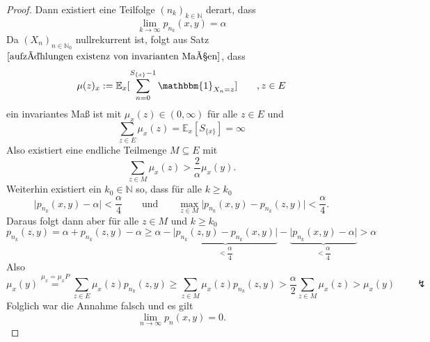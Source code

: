 \documentclass[a4paper,12pt]{scrartcl}
\theoremstyle{definition}
\begin{document}
\begin{proof}
Dann existiert eine Teilfolge $(n_{k})_{k \in \mathbb{N}}$ derart, dass
\begin{equation*}
\lim_{k \to \infty} p_{n_{k}}(x,y) = \alpha
\end{equation*}
Da $(X_{n})_{n \in \mathbb{N}_{0}}$ nullrekurrent ist, folgt aus Satz $\ref{aufzählungen existenz von invarianten Maßen}$, dass 
\begin{equation*}
\mu(z)_{x} := \mathbb{E}_{x}[\sum_{n=0}^{S_{\lbrace x \rbrace}-1} \mathbbm{1}_{X_{n}=z}] \qquad , z \in E
\end{equation*}
ein invariantes Maß ist mit $\mu_{x}(z) \in (0,\infty)$ für alle $z \in E$ und
\begin{equation*}
\sum_{z \in E} \mu_{x}(z) = \mathbb{E}_{x}[S_{\lbrace x \rbrace}] = \infty
\end{equation*}
Also existiert eine endliche Teilmenge $M \subseteq E$ mit 
\begin{equation*}
\sum_{z \in M} \mu_{x}(z) > \dfrac{2}{\alpha} \mu_{x}(y).
\end{equation*}
Weiterhin existiert ein $k_{0} \in \mathbb{N}$ so, dass für alle $k \geq k_{0}$
\begin{equation*}
\vert p_{n_{k}}(x,y) - \alpha \vert < \dfrac{\alpha}{4} \qquad \mathrm{und} \qquad \max_{z \in M} \vert p_{n_{k}}(x,y) - p_{n_{k}}(z,y)  \vert < \dfrac{\alpha}{4}.
\end{equation*}
Daraus folgt dann aber für alle $z \in M$ und $k \geq k_{0}$
\begin{equation*}
p_{n_{k}}(z,y) = \alpha + p_{n_{k}}(z,y) - \alpha \geq \alpha - \underbrace{\vert p_{n_{k}}(z,y) - p_{n_{k}}(x,y) \vert}_{< \dfrac{\alpha}{4}} - \underbrace{\vert p_{n_{k}}(x,y) - \alpha \vert}_{<\dfrac{\alpha}{4}} > \alpha
\end{equation*}
Also
\begin{equation*}
\mu_{x}(y) \stackrel{\mu_{x} = \mu_{x}P}{=} \sum_{z \in E} \mu_{x}(z) p_{n_{k}}(z,y) \geq \sum_{z \in M} \mu_{x}(z) p_{n_{k}}(z,y) > \dfrac{\alpha}{2} \sum_{z \in M} \mu_{x}(z) > \mu_{x}(y) \qquad \lightning
\end{equation*}
Folglich war die Annahme falsch und es gilt
\begin{equation*}
\lim_{n \to \infty} p_{n}(x,y) = 0.
\end{equation*}
\end{proof}
\end{document}
